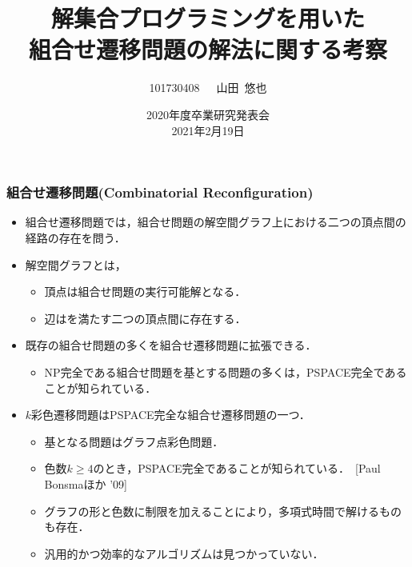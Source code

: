 \documentclass[dvipdfmx,11pt]{beamer}
\title[ASPを用いた組合せ遷移問題の解法に関する考察]{解集合プログラミングを用いた\\組合せ遷移問題の解法に関する考察}
\author{101730408~~~山田~悠也}
\date{2020年度卒業研究発表会\\2021年2月19日}
\institute{番原研究室}
\begin{document}
\begin{frame}\frametitle{}
  \titlepage
\end{frame}

\begin{frame}\frametitle{組合せ遷移問題(Combinatorial Reconfiguration)}

  \begin{itemize}
    \item \alert{組合せ遷移問題}では，組合せ問題の解空間グラフ上における二つの頂点間の経路の存在を問う．
    \item \alert{解空間グラフ}とは，
    \begin{itemize}
      \item 頂点は組合せ問題の実行可能解となる．
      \item 辺はを満たす二つの頂点間に存在する．
    \end{itemize} 
    \item 既存の組合せ問題の多くを組合せ遷移問題に拡張できる．
    \begin{itemize}
      \item NP完全である組合せ問題を基とする問題の多くは，\alert{PSPACE完全}であることが知られている．
    \end{itemize}
    \item \alert{$k$彩色遷移問題}はPSPACE完全な組合せ遷移問題の一つ．
    \begin{itemize}
      \item 基となる問題はグラフ点彩色問題．
      \item 色数\alert{$k \geq 4$}のとき，PSPACE完全であることが知られている．~[Paul Bonsmaほか '09]
      \item グラフの形と色数に制限を加えることにより，多項式時間で解けるものも存在．
      \item \alert{汎用的かつ効率的なアルゴリズムは見つかっていない}．
    \end{itemize}
  \end{itemize}

\end{frame}

\end{document}
